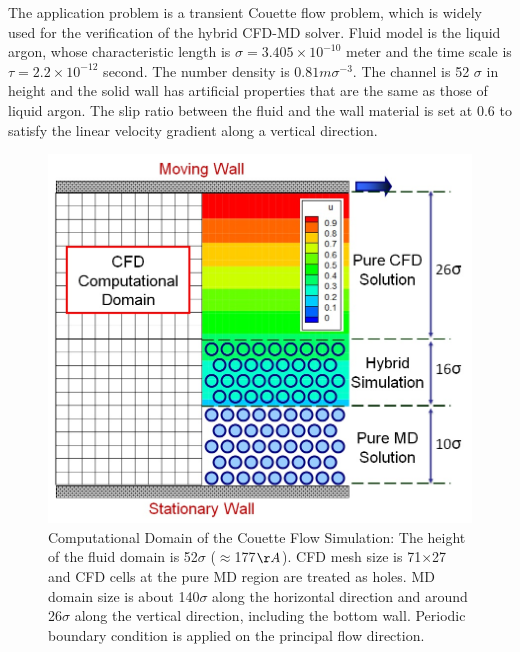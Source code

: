 \documentclass[]{aiaa-tc}%
\begin{document}
The application problem is a transient Couette flow problem, which is widely used
for the verification of the hybrid CFD-MD solver. Fluid model is the liquid argon, whose
characteristic length is ${\sigma}=3.405{\times}10^{-10}$ meter and the time scale is 
$\tau=2.2{\times}10^{-12}$ second. The number density is $0.81m{\sigma}^{-3}$.
The channel is 52 $\sigma$ in height and the solid wall has artificial properties 
that are the same as those of liquid argon. The slip ratio between the fluid and the wall
material is set at 0.6 to satisfy the linear velocity gradient along a vertical 
direction.~\cite{Nie}


\begin{figure}
\includegraphics{Couette_Val_Domain.jpg}
\caption{Computational Domain of the Couette Flow Simulation: The height 
of the fluid domain is 52$\sigma$ ($\approx$177$\AA$). CFD mesh size is 
71$\times$27 and CFD cells at the pure MD region are treated as holes. 
MD domain size is about 140$\sigma$ along the horizontal direction and 
around 26$\sigma$ along the vertical direction, including the bottom wall. 
Periodic boundary condition is applied on the principal flow direction.}
\label{Fig:Couette_Val_Domain}
\end{figure}
\end{document}
